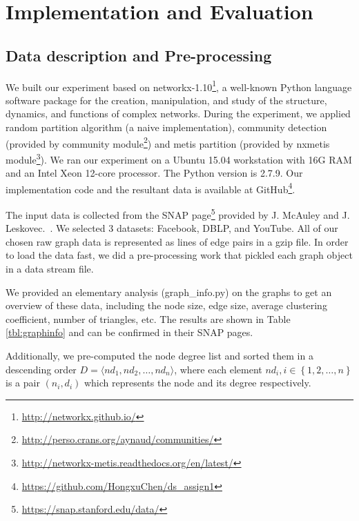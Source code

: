 \section{Implementation and Evaluation} \label{sec:sec4}

\subsection{Data description and Pre-processing}

We built our experiment based on networkx-1.10\footnote{\url{http://networkx.github.io/}}, a well-known Python language software package for the creation, manipulation, and study of the structure, dynamics, and functions of complex networks. During the experiment, we applied random partition algorithm (a naive implementation), community detection (provided by community module\footnote{\url{http://perso.crans.org/aynaud/communities/}}) and metis partition (provided by nxmetis module\footnote{\url{http://networkx-metis.readthedocs.org/en/latest/}}). We ran our experiment on a Ubuntu 15.04 workstation with 16G RAM and an Intel Xeon 12-core processor. The Python version is 2.7.9. Our implementation code and the resultant data is available at GitHub\footnote{\url{https://github.com/HongxuChen/ds_assign1}}. 

The input data is collected from the SNAP page\footnote{\url{https://snap.stanford.edu/data/}} provided by J. McAuley and J. Leskovec.~\cite{Mcauley:2014:DSC:2582178.2556612}. We selected 3 datasets: Facebook, DBLP, and YouTube. All of our chosen raw graph data is represented as lines of edge pairs in a gzip file. In order to load the data fast, we did a pre-processing work that pickled each graph object in a data stream file.

We provided an elementary analysis (\textsf{graph\_info.py}) on the graphs to get an overview of these data, including the node size, edge size, average clustering coefficient, number of triangles, etc. The results are shown in Table \ref{tbl:graphinfo} and can be confirmed in their SNAP pages.

Additionally, we pre-computed the node degree list and sorted them in a descending order $D=\langle nd_1, nd_2, \ldots, nd_n\rangle$, where each element $nd_i, i\in \left\{1,2,\ldots, n\right\}$ is a pair $(n_i, d_i)$ which represents the node and its degree respectively.


